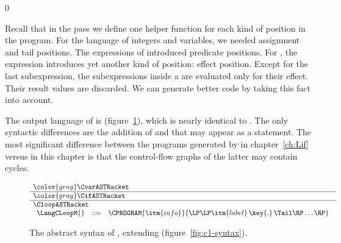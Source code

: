 \documentclass[7x10]{TimesAPriori_MIT}%
\newcommand{\gray}[1]{{\color{gray} #1}}
\def\racketEd{0}
\providecommand{\BookEdition}{1}
\let\edition\BookEdition
\numberwithin{theorem}{chapter}
\numberwithin{definition}{chapter}
\numberwithin{equation}{chapter}
\begin{document}
{\if\edition\racketEd

Recall that in the  pass we define one helper
function for each kind of position in the program.  For the \LangVarANF{}
language of integers and variables, we needed assignment and tail
positions. The  expressions of \LangIfANF{} introduced predicate
positions. For \LangLoopANF{}, the  expression introduces yet
another kind of position: effect position. Except for the last
subexpression, the subexpressions inside a  are evaluated
only for their effect. Their result values are discarded. We can
generate better code by taking this fact into account.

The output language of  is \LangCLoop{}
(figure~\ref{fig:c7-syntax}), which is nearly identical to
\LangCIf{}. The only syntactic differences are the addition of \VOID{}
and that  may appear as a statement.  The most significant
difference between the programs generated by 
in chapter~\ref{ch:Lif} versus  in this
chapter is that the control-flow graphs of the latter may contain
cycles.

\begin{figure}[tp]
\begin{tcolorbox}[colback=white]    
\small
\[
\begin{array}{l}
  \gray{\CvarASTRacket} \\ \hline
  \gray{\CifASTRacket} \\ \hline
  \CloopASTRacket \\
\begin{array}{lcl}
\LangCLoopM{} & ::= & \CPROGRAM{\itm{info}}{\LP\LP\itm{label}\,\key{.}\,\Tail\RP\ldots\RP}
\end{array}
\end{array}
\]
\end{tcolorbox}

\caption{The abstract syntax of \LangCLoop{}, extending \LangCIf{} (figure~\ref{fig:c1-syntax}).}
\label{fig:c7-syntax}
\end{figure}

}
\end{document}
